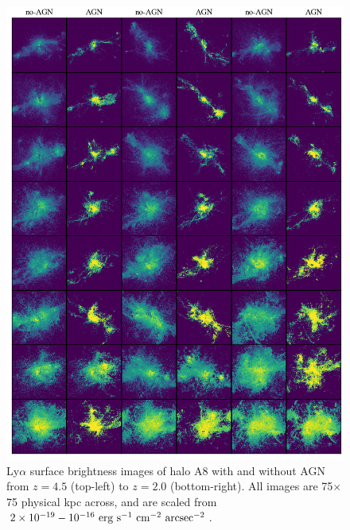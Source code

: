 \begin{figure}
    \centering
    \includegraphics[width=\textwidth,keepaspectratio]{figures/agn_rogues_A8.png}
    \caption{
        Ly$\alpha$ surface brightness images of halo A8 with and without AGN from $z=4.5$ (top-left) to $z=2.0$ (bottom-right).
        All images are 75$\times$75 physical kpc across, and are scaled from $2\times10^{-19}-10^{-16}\ \rm{erg}\ \rm{s}^{-1}\ \rm{cm}^{-2}\ \rm{arcsec}^{-2}$.
    }
  \label{fig:agn_rogues8}
\end{figure}

